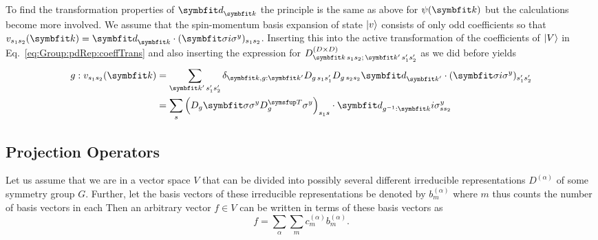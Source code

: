To find the transformation properties of $\v{d}_\v{k}$ the principle is the same as above for $\psi(\v{k})$ but the calculations become more involved.
We assume that the spin-momentum basis expansion of state $\lvert v \rangle$ consists of only odd coefficients so that
$v_{s_1s_2}(\v{k}) = \v{d}_\v{k}\cdot(\v{\sigma}i\sigma^y)_{s_1s_2}$. Inserting this into the active transformation of the coefficients of $\lvert V \rangle$ in
Eq.~\eqref{eq:Group:pdRep:coeffTrans} and also inserting the expression for $D^{(D\times D)}_{\v{k}\,s_1s_2;\,\v{k}'\,s_1's_2'}$ as we did before yields
\begin{equation}
    \label{eq:Group:pdRep:oddCoeffTrans}
    \begin{split}
        g:v_{s_1s_2}(\v{k}) &= \sum_{\v{k}'\,s_1's_2'}\delta_{\v{k},g:\v{k}'}D_{g\,s_1s_1'}D_{g\,s_2s_2}\v{d}_{\v{k}'}\cdot(\v{\sigma}i\sigma^y)_{s_1's_2'}\\
        &= \sum_s\Big(D_g\v{\sigma}\sigma^yD_g^\trans\sigma^y\Big)_{s_1s}\cdot\v{d}_{g^{-1}:\v{k}}i\sigma^y_{ss_2}
    \end{split}
\end{equation}

\subsection{Projection Operators}

Let us assume that we are in a vector space $V$ that can be divided into possibly several different irreducible representations $D^{(\alpha)}$ of some
symmetry group $G$. Further, let the basis vectors of these irreducible representations be denoted by $b^{(\alpha)}_m$ where $m$ thus counts the number
of basis vectors in each \irr Then an arbitrary vector $f\in V$ can be written in terms of these basis vectors as
\begin{equation}
    \label{eq:Group:Irr:Pro:basisDecomp}
    f = \sum_\alpha\sum_m c_m^{(\alpha)}b^{(\alpha)}_m.
\end{equation}

